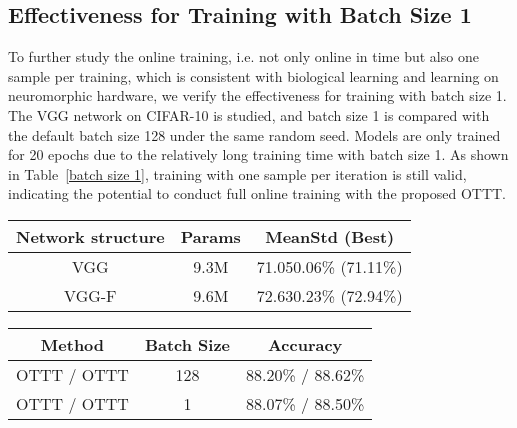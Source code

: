 \documentclass{article}
\begin{document}
\vspace{-2mm}
\subsection{Effectiveness for Training with Batch Size 1}
\vspace{-2.5mm}

To further study the online training, i.e. not only online in time but also one sample per training, which is consistent with biological learning and learning on neuromorphic hardware, we verify the effectiveness for training with batch size 1. The VGG network on CIFAR-10 is studied, and batch size 1 is compared with the default batch size 128 under the same random seed. Models are only trained for 20 epochs due to the relatively long training time with batch size 1. As shown in Table~\ref{batch size 1}, training with one sample per iteration is still valid, indicating the potential to conduct full online training with the proposed OTTT.

\begin{minipage}{0.48\linewidth}
\newcommand{\tabincell}[2]{\begin{tabular}{@{}#1@{}}#2\end{tabular}}
	\centering
	\small
	\tabcolsep=0.5mm
	\begin{tabular}{ccc}
		\toprule[1pt]
		Network structure & Params & MeanStd (Best)\\
		\midrule[0.5pt]
		VGG & 9.3M & 71.050.06\% (71.11\%)\\
		VGG-F & 9.6M & 72.630.23\% (72.94\%)\\
		\bottomrule[1pt]
	\end{tabular}
	\label{feedback network}
\end{minipage}
\hspace{4mm}
\begin{minipage}{0.48\linewidth}
	\centering
	\small
	\tabcolsep=0.5mm
	\begin{tabular}{ccc}
		\toprule[1pt]
		Method & Batch Size & Accuracy\\
		\midrule[0.5pt]
		OTTT / OTTT & 128 & 88.20\% / 88.62\%\\
		OTTT / OTTT & 1 & 88.07\% / 88.50\%\\
		\bottomrule[1pt]
	\end{tabular}
	\label{batch size 1}
\end{minipage}
\end{document}

